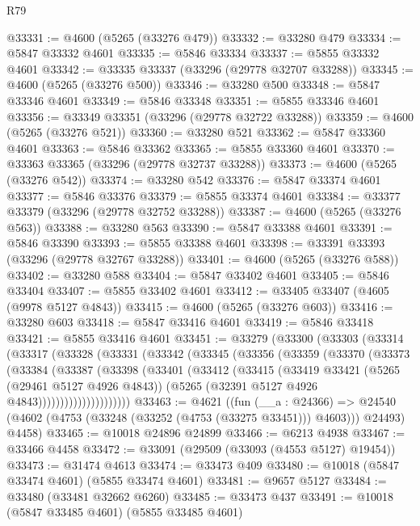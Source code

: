 \begin{lexlean}{R79}
\begin{coremodule}
@33331 := @4600 (@5265 (@33276 @479))
@33332 := @33280 @479
@33334 := @5847 @33332 @4601
@33335 := @5846 @33334
@33337 := @5855 @33332 @4601
@33342 := @33335 @33337 (@33296 (@29778 @32707 @33288))
@33345 := @4600 (@5265 (@33276 @500))
@33346 := @33280 @500
@33348 := @5847 @33346 @4601
@33349 := @5846 @33348
@33351 := @5855 @33346 @4601
@33356 := @33349 @33351 (@33296 (@29778 @32722 @33288))
@33359 := @4600 (@5265 (@33276 @521))
@33360 := @33280 @521
@33362 := @5847 @33360 @4601
@33363 := @5846 @33362
@33365 := @5855 @33360 @4601
@33370 := @33363 @33365 (@33296 (@29778 @32737 @33288))
@33373 := @4600 (@5265 (@33276 @542))
@33374 := @33280 @542
@33376 := @5847 @33374 @4601
@33377 := @5846 @33376
@33379 := @5855 @33374 @4601
@33384 := @33377 @33379 (@33296 (@29778 @32752 @33288))
@33387 := @4600 (@5265 (@33276 @563))
@33388 := @33280 @563
@33390 := @5847 @33388 @4601
@33391 := @5846 @33390
@33393 := @5855 @33388 @4601
@33398 := @33391 @33393 (@33296 (@29778 @32767 @33288))
@33401 := @4600 (@5265 (@33276 @588))
@33402 := @33280 @588
@33404 := @5847 @33402 @4601
@33405 := @5846 @33404
@33407 := @5855 @33402 @4601
@33412 := @33405 @33407 (@4605 (@9978 @5127 @4843))
@33415 := @4600 (@5265 (@33276 @603))
@33416 := @33280 @603
@33418 := @5847 @33416 @4601
@33419 := @5846 @33418
@33421 := @5855 @33416 @4601
@33451 := @33279
    (@33300
      (@33303
        (@33314
          (@33317
            (@33328
              (@33331
                (@33342
                  (@33345
                    (@33356
                      (@33359
                        (@33370
                          (@33373
                            (@33384
                              (@33387
                                (@33398
                                  (@33401
                                    (@33412
                                      (@33415
                                        (@33419
                                          @33421
                                          (@5265 (@29461 @5127 @4926 @4843))
                                          (@5265 (@32391 @5127 @4926 @4843)))))))))))))))))))))
@33463 := @4621
    ((fun (__a : @24366) =>
    @24540 (@4602 (@4753 (@33248 (@33252 (@4753 (@33275 @33451))) @4603))) @24493)
      @4458)
@33465 := @10018 @24896 @24899
@33466 := @6213 @4938
@33467 := @33466 @4458
@33472 := @33091 (@29509 (@33093 (@4553 @5127) @19454))
@33473 := @31474 @4613
@33474 := @33473 @409
@33480 := @10018 (@5847 @33474 @4601) (@5855 @33474 @4601)
@33481 := @9657 @5127
@33484 := @33480 (@33481 @32662 @6260)
@33485 := @33473 @437
@33491 := @10018 (@5847 @33485 @4601) (@5855 @33485 @4601)

\end{coremodule}
\end{lexlean}
